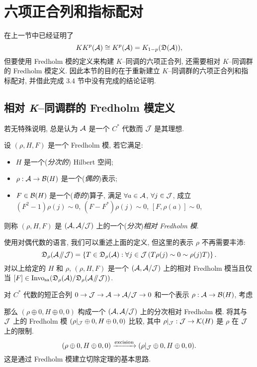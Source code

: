 \section{六项正合列和指标配对}

在上一节中已经证明了
\[
	KK^p(\mathcal{A})\cong K^p(\mathcal{A})=K_{1-p}(\mathfrak{D}(\mathcal{A})),
\]
但要使用 Fredholm 模的定义来构建 $ K $--同调的六项正合列, 还需要相对 $ K $--同调群的 Fredholm 模定义. 因此本节的目的在于重新建立 $ K $--同调群的六项正合列和指标配对, 并借此完成 3.4 节中没有完成的结论证明.

\subsection{相对 \textit{K}--同调群的 Fredholm 模定义}

若无特殊说明, 总是认为 $ \mathcal{A} $ 是一个 $ C^* $ 代数而 $ \mathcal{J} $ 是其理想.

\begin{Definition}
	设 $ (\rho, H, F) $ 是一个 Fredholm 模, 若它满足:
	\begin{itemize}
		\item $ H $ 是一个(\textit{分次的}) Hilbert 空间;
		\item $ \rho : \mathcal{A}\to\mathcal{B}(H) $ 是一个(\textit{偶的})表示;
		\item $ F\in\mathcal{B}(H) $ 是一个(\textit{奇的})算子, 满足 $ \forall a\in\mathcal{A} $, $ \forall j\in\mathcal{J} $, 成立 $ (F^2-1)\rho(j)\sim 0 $, $ (F-F^*)\rho(j)\sim 0 $, $ [F,\rho(a)]\sim 0 $,
	\end{itemize}
	则称 $ (\rho, H, F) $ 是 $ (\mathcal{A},\mathcal{A}/\mathcal{J}) $ 上的一个(\textit{分次})\emph{相对 Fredholm 模}.
\end{Definition}

使用对偶代数的语言, 我们可以重述上面的定义, 但这里的表示 $ \rho $ 不再需要丰沛:
\[
	\mathfrak{D}_\rho(\mathcal{A}\mathbin{\!/\mkern-5mu/\!}\mathcal{J})=\left\{ T\in\mathfrak{D}_{\rho}(\mathcal{A}) : \forall j\in\mathcal{J}\,(T\rho(j)\sim 0\sim\rho(j)T) \right\}.
\]
对以上给定的 $ H $ 和 $ \rho $, $ (\rho, H, F) $ 是一个 $ (\mathcal{A},\mathcal{A}/\mathcal{J}) $ 上的相对 Fredholm 模当且仅当 $ [F]\in\text{Invo}_{\text{sa}}(\mathfrak{D}_\rho(\mathcal{A})/\mathfrak{D}_{\rho}(\mathcal{A}\mathbin{\!/\mkern-5mu/\!}\mathcal{J})) $.

对 $ C^* $ 代数的短正合列 $ 0\to\mathcal{J}\to\mathcal{A}\to\mathcal{A}/\mathcal{J}\to 0 $ 和一个表示 $ \rho : \mathcal{A}\to\mathcal{B}(H) $, 考虑
\begin{center}
\end{center}
那么 $ (\rho\oplus 0, H\oplus 0, 0) $ 构成一个 $ (\mathcal{A},\mathcal{A}/\mathcal{J}) $ 上的分次相对 Fredholm 模. 将其与 $ \mathcal{J} $ 上的 Fredholm 模 $ (\rho|_{\mathcal{J}}\oplus 0, H\oplus 0, 0) $ 比较, 其中 $ \rho|_{\mathcal{J}} : \mathcal{J}\to\mathcal{K}(H) $ 是 $ \rho $ 在 $ \mathcal{J} $ 上的限制.
\[
	(\rho\oplus 0, H\oplus 0, 0)\xrightarrow{\text{excision}}(\rho|_{\mathcal{J}}\oplus 0, H\oplus 0, 0).
\]
这是通过 Fredholm 模建立切除定理的基本思路.

